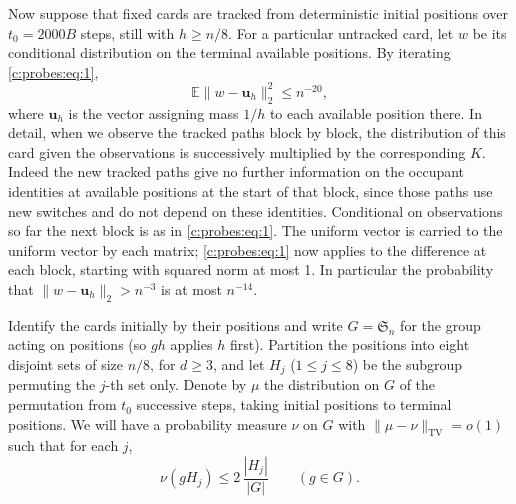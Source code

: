 Now suppose that fixed cards are tracked from deterministic initial positions over \(t_0=2000
B\) steps, still with \(h\ge n/8\). For a particular untracked card, let \(w\) be its
conditional distribution on the terminal available positions. By iterating \eqref{c:probes:eq:1},
\begin{equation}
\mathbb E\|w-\mathbf u_h\|_2^2\le n^{-20},                              \label{c:probes:eq:6}
\end{equation}
where \(\mathbf u_h\) is the vector assigning mass \(1/h\) to each available position there. In detail, when
we observe the tracked paths block by block, the distribution of this card given the
observations is successively multiplied by the corresponding \(K\). Indeed the new tracked
paths give no further information on the occupant identities at available positions at the start of that
block, since those paths use new switches and do not depend on these identities. Conditional on
observations so far the next block is as in \eqref{c:probes:eq:1}. The uniform vector is
carried to the uniform vector by each matrix; \eqref{c:probes:eq:1} now applies to the
difference at each block, starting with squared norm at most 1. In particular the probability
that \(\|w-\mathbf u_h\|_2>n^{-3}\) is at most \(n^{-14}\).

\label{c:probes:p019}

Identify the cards initially by their positions and write \(G=\mathfrak S_n\) for the group
acting on positions (so \(g h\) applies \(h\) first). Partition the positions into eight
disjoint sets of size \(n/8\), for \(d\ge3\), and let \(H_j\) (\(1\le j\le8\)) be the subgroup
permuting the \(j\)-th set only. Denote by \(\mu\) the distribution on \(G\) of the permutation
from \(t_0\) successive steps, taking initial positions to terminal positions. We will have a
probability measure \(\nu\) on \(G\) with \(\|\mu-\nu\|_{\mathrm{TV}}=o(1)\) such that for each
\(j\),
\begin{equation}
\nu(gH_j)\le 2\,\frac{|H_j|}{|G|}\qquad(g\in G).                   \label{c:probes:eq:7}
\end{equation}

\label{c:probes:p020}

